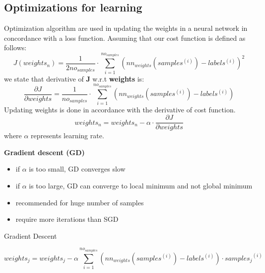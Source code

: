 \subsection{Optimizations for learning}
Optimization algorithm are used in updating the weights in a neural network in concordance with a loss function.
\label{optimization}
Assuming that our cost function is defined as follows\cite{ng}:
\begin{equation}
	J(weights_n) = \frac{1}{2no_{samples}}\cdot\displaystyle\sum_{i=1}^{no_{samples}}(nn_{weights}(samples^{(i)}) - labels^{(i)})^2
\end{equation}
we state that derivative of \textbf{J} w.r.t \textbf{weights} is\cite{ng}:
\begin{equation}
	\frac{\partial J}{\partial weights} = \frac{1}{no_{samples}}\cdot\displaystyle\sum_{i=1}^{no_{samples}}(nn_{weights}(samples^{(i)}) - labels^{(i)})
\end{equation}
Updating weights\cite{ng} is done in accordance with the derivative of cost function.
\begin{equation}
	weights_n = weights_n - \alpha\cdot\frac{\partial J}{\partial weights}
\end{equation}
where $\alpha$ represents learning rate.

\newpage
\textbf{Gradient descent (GD)}

\begin{itemize}
	\item{if $\alpha$ is too small, GD converges slow}
	\item{if $\alpha$ is too large, GD can converge to local minimum and not global minimum}
	\item{recommended for huge number of samples}
	\item{require more iterations than SGD}
\end{itemize}

\begin{algorithm}
	\caption{Gradient Descent\cite{ng}} \label{gd-code}
	\begin{algorithmic}[1]
		\Repeat
       				\begin{equation}
					weights_j = weights_j - \alpha\displaystyle\sum_{i=1}^{no_{samples}}(nn_{weights}(samples^{(i)}) - labels^{(i)})\cdot {samples_j}^{(i)}
					\end{equation}
      			\EndFor
	\end{algorithmic}
\end{algorithm}


